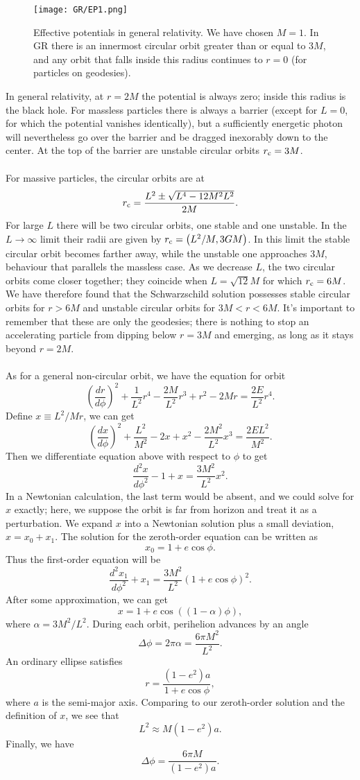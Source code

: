 \begin{figure}
\centering
\texttt{[image: GR/EP1.png]}
\caption{Effective potentials in general relativity. We have chosen $M = 1$. In GR there is an innermost circular orbit greater than or equal to $3M$, and any orbit that falls inside this radius continues to $r = 0$ (for particles on geodesies).}
\end{figure}

\noindent
In general relativity, at $r = 2M$ the potential is always zero; inside this radius is the black hole.
For massless particles there is always a barrier (except for $L = 0$, for which the potential vanishes identically), but a sufficiently energetic photon will  nevertheless go over the barrier and be dragged inexorably down to the center. At the top of the barrier are unstable circular orbits $r_{\rm c} = 3M$.
\\ \\
For massive particles, the circular orbits are at
\[r_{\rm c} = \frac{L^2 \pm \sqrt{L^4-12M^2L^2}}{2M}.\]
For large $L$ there will be two circular orbits, one stable and one unstable. In the $L \to \infty$ limit their radii are given by $r_{\rm c} = \left(L^2/M, 3GM \right)$.
In this limit the stable circular orbit becomes farther away, while the unstable one approaches $3M$, behaviour that parallels the massless case. As we decrease $L$,
the two circular orbits come closer together; they coincide when $L = \sqrt{12}M$ for which $r_{\rm c} = 6M$. We have therefore found that the Schwarzschild solution possesses stable circular orbits for $r > 6M$ and unstable circular orbits for $3M < r < 6M$. 
It's important to remember that these are only the geodesies; there is nothing to stop an accelerating particle from dipping below $r = 3M$ and emerging, as long as it stays beyond $r = 2M$.
\\ \\
As for a general non-circular orbit, we have the equation for orbit
\[\left(\frac{dr}{d\phi}\right)^2 + \frac{1}{L^2}r^4 - \frac{2M}{L^2}r^3 + r^2 - 2Mr = \frac{2E}{L^2}r^4. \] 
Define $x \equiv L^2/Mr$, we can get
\[\left(\frac{dx}{d\phi}\right)^2 + \frac{L^2}{M^2} - 2x + x^2 - \frac{2M^2}{L^2}x^3 = \frac{2EL^2}{M^2}. \]
Then we differentiate equation above with respect to $\phi$ to get
\[\frac{d^2x}{d\phi^2} - 1 + x = \frac{3M^2}{L^2}x^2.\]
In a Newtonian calculation, the last term would be absent, and we could solve for $x$ exactly; here, we suppose the orbit is far from horizon and treat it as a perturbation.
We expand $x$ into a Newtonian solution plus a small deviation, $x = x_0 + x_1$. The solution for the zeroth-order equation can be written as
\[x_0 = 1 + e\cos\phi.\]
Thus the first-order equation will be
\[\frac{d^2x_1}{d\phi^2} + x_1 = \frac{3M^2}{L^2}(1+e\cos\phi)^2.\]
After some approximation, we can get
\[x = 1 + e\cos((1-\alpha)\phi),\]
where $\alpha = 3M^2/L^2$. During each orbit, perihelion 
advances by an angle
\[\Delta \phi = 2\pi \alpha = \frac{6\pi M^2}{L^2}.\]
An ordinary ellipse satisfies
\[r = \frac{(1-e^2)a}{1+e\cos\phi},\]
where $a$ is the semi-major axis. Comparing to our zeroth-order solution and the definition of $x$, we see that
\[L^2 \approx M(1-e^2)a.\]
Finally, we have
\[\Delta \phi = \frac{6\pi M}{(1-e^2)a}.\]

